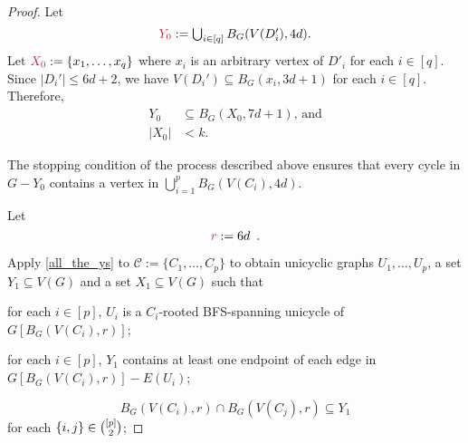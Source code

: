 \documentclass{patmorin}
\newcommand{\pat}[1]{\textcolor{Blue}{[Pat: #1]}}
\newcommand{\gwen}[1]{\textcolor{Purple}{Gwen: #1}}
\DeclarePairedDelimiter\set{\{}{\}}
\begin{document}
\begin{proof}
   Let
   \[
        \textstyle\mathdefin{Y_0}:=\bigcup_{i\in[q]}B_G(V(D'_i),4d).
   \]
  Let $\mathdefin{X_0}:=\{x_1,\ldots,x_{q}\}$ where  $x_i$ is an arbitrary vertex of $D'_i$ for each $i\in[q]$.
  Since $|D_i'|\leq 6d+2$, we have $V(D_i')\subseteq B_G(x_i,3d+1)$ for each $i\in[q]$.
  Therefore,
\begin{align}
  Y_0&\subseteq B_G(X_0,7d+1)\text{, and}\label{eq:M-contained-in-a-ball}\\
  |X_0|&< k.\label{eq:XM-size}
\end{align}

The stopping condition of the process described above ensures that
every cycle in $G-Y_0$ contains a vertex in $\bigcup_{i=1}^p B_G(V(C_i),4d)$.

Let
\[
\mathdefin{r}:=6d\enspace .
\]

Apply \cref{all_the_ys} to $\mathcal{C}:=\{C_1,\ldots,C_p\}$ to obtain unicyclic graphs $U_1,\ldots,U_p$, a set
 $Y_1\subseteq V(G)$ and a set $X_1\subseteq V(G)$ such that
    \begin{tightenum}%
      \item for each $i\in[p]$, $U_i$ is a  $C_i$-rooted BFS-spanning unicycle of $G[B_G(V(C_i),r)]$;
      \item for each $i\in[p]$, $Y_1$
      contains at least one endpoint of each edge in $G[B_G(V(C_i),r)]- E(U_i)$;
\end{tightenum}
\begin{equation}
B_{G}(V(C_i),r)\cap B_{G}(V(C_j),r)\subseteq Y_1
\end{equation}
for each $\set{i,j}\in\binom{[p]}{2}$;

\end{proof}
\end{document}
